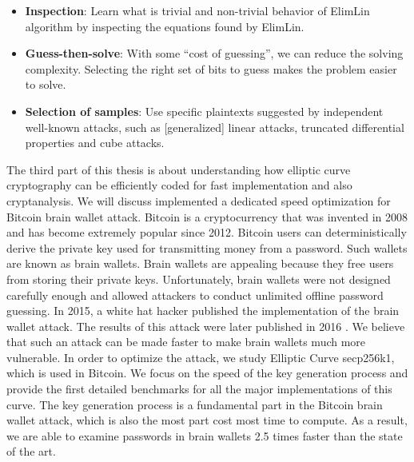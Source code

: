 \begin{itemize}
	\item \textbf{Inspection}: Learn what is trivial and non-trivial behavior of ElimLin algorithm by inspecting the equations found by ElimLin.
	\item \textbf{Guess-then-solve}: With some ``cost of guessing'', we can reduce the solving complexity. Selecting the right set of bits to guess makes the problem easier to solve.
	\item \textbf{Selection of samples}: Use specific plaintexts suggested by independent well-known attacks,
	such as [generalized] linear attacks, truncated differential properties and cube attacks.
\end{itemize}

The third part of this thesis is about understanding how elliptic curve cryptography can be efficiently coded for fast implementation and also cryptanalysis. We will discuss implemented a dedicated speed optimization for Bitcoin brain wallet attack. Bitcoin is a cryptocurrency that was invented in 2008 and has become extremely popular since 2012. Bitcoin users can deterministically derive the private key used for transmitting money from a password. Such wallets are known as brain wallets. Brain wallets are appealing because they free users from storing their private keys. Unfortunately, brain wallets were not designed carefully enough and allowed attackers to conduct unlimited offline password guessing. In 2015, a white hat hacker published the implementation of the brain wallet attack. The results of this attack were later published in 2016 \cite{vasek2016bitcoin}. We believe that such an attack can be made faster to make brain wallets much more vulnerable. In order to optimize the attack, we study Elliptic Curve secp256k1, which is used in Bitcoin. We focus on the speed of the key generation process and provide the first detailed benchmarks for all the major implementations of this curve. The key generation process is a fundamental part in the Bitcoin brain wallet attack, which is also the most part cost most time to compute. As a result, we are able to examine passwords in brain wallets 2.5 times faster than the state of the art.